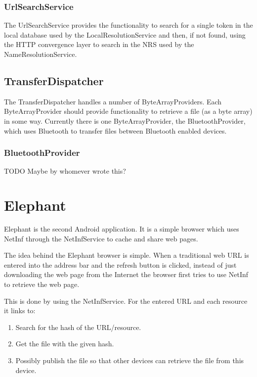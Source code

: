 \subsubsection{UrlSearchService}

The UrlSearchService provides the functionality to search for a single token in the local database used by the LocalResolutionService and then, if not found, using the HTTP convergence layer to search in the NRS used by the NameResolutionService.

\subsection{TransferDispatcher}
\label{sec:TransferDispatcher}

The TransferDispatcher handles a number of ByteArrayProviders. Each ByteArrayProvider should provide functionality to retrieve a file (as a byte array) in some way. Currently there is one ByteArrayProvider, the BluetoothProvider, which uses Bluetooth to transfer files between Bluetooth enabled devices.

\subsubsection{BluetoothProvider}

TODO Maybe by whomever wrote this?

\section{Elephant}
\label{sec:Elephant}

Elephant is the second Android application. It is a simple browser which uses NetInf through the NetInfService to cache and share web pages.

The idea behind the Elephant browser is simple. When a traditional web URL is entered into the address bar and the refresh button is clicked, instead of just downloading the web page from the Internet the browser first tries to use NetInf to retrieve the web page.

This is done by using the NetInfService. For the entered URL and each resource it links to:
\begin{enumerate}
	\item Search for the hash of the URL/resource.
	\item Get the file with the given hash.
	\item Possibly publish the file so that other devices can retrieve the file from this device.
\end{enumerate}

